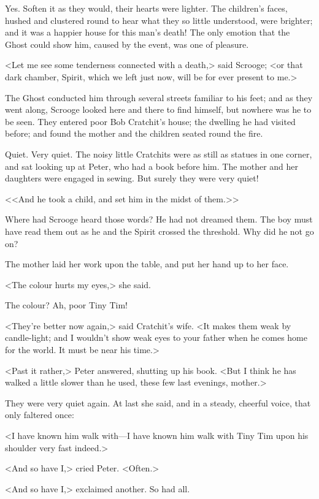 Yes. Soften it as they would, their hearts were lighter. The children's faces, hushed and clustered round to hear what they so little understood, were brighter; and it was a happier house for this man's death! The only emotion that the Ghost could show him, caused by the event, was one of pleasure.

<Let me see some tenderness connected with a death,> said Scrooge; <or that dark chamber, Spirit, which we left just now, will be for ever present to me.>

The Ghost conducted him through several streets familiar to his feet; and as they went along, Scrooge looked here and there to find himself, but nowhere was he to be seen. They entered poor Bob Cratchit's house; the dwelling he had visited before; and found the mother and the children seated round the fire.

Quiet. Very quiet. The noisy little Cratchits were as still as statues in one corner, and sat looking up at Peter, who had a book before him. The mother and her daughters were engaged in sewing. But surely they were very quiet!

<<And he took a child, and set him in the midst of them.>>

Where had Scrooge heard those words? He had not dreamed them. The boy must have read them out as he and the Spirit crossed the threshold. Why did he not go on?

The mother laid her work upon the table, and put her hand up to her face.

<The colour hurts my eyes,> she said.

The colour? Ah, poor Tiny Tim!

<They're better now again,> said Cratchit's wife. <It makes them weak by candle-light; and I wouldn't show weak eyes to your father when he comes home for the world. It must be near his time.>

<Past it rather,> Peter answered, shutting up his book. <But I think he has walked a little slower than he used, these few last evenings, mother.>

They were very quiet again. At last she said, and in a steady, cheerful voice, that only faltered once:

<I have known him walk with—I have known him walk with Tiny Tim upon his shoulder very fast indeed.>

<And so have I,> cried Peter. <Often.>

<And so have I,> exclaimed another. So had all.


